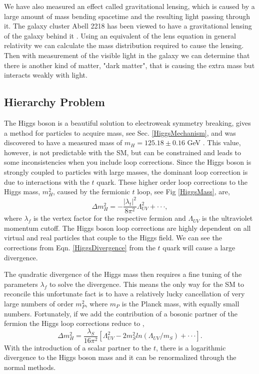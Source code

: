 We have also measured an effect called gravitational lensing, which is caused by a large amount of mass bending spacetime and the resulting light passing through it. The galaxy cluster Abell 2218 has been viewed to have a gravitational lensing of the galaxy behind it \cite{saraniti_gravitational_1996}. Using an equivalent of the lens equation in general relativity we can calculate the mass distribution required to cause the lensing. Then with measurement of the visible light in the galaxy we can determine that there is another kind of matter, "dark matter", that is causing the extra mass but interacts weakly with light. 

\subsection{Hierarchy Problem} 
The Higgs boson is a beautiful solution to electroweak symmetry breaking, gives a method for particles to acquire mass, see Sec. \ref{HiggsMechanism},  and was discovered to have a measured mass of $m_{H}=125.18\pm0.16$ GeV \cite{chatrchyan_observation_2012, aad_observation_2012, chatrchyan_observation_2013, atlas_collaboration_combined_2015}. This value, however, is not predictable with the SM, but can be constrained and leads to some inconsistencies when you include loop corrections. Since the Higgs boson is strongly coupled to particles with large masses, the dominant loop correction is due to interactions with the $t$ quark. These higher order loop corrections to the Higgs mass, $m_H^2$, caused by the fermionic $t$ loop, see Fig \ref{HiggsMass}, are,
\begin{equation} \label{HiggsDivergence}
\Delta m_{H}^{2}=-\frac{|\lambda_{t}|^{2}}{8\pi^{2}}\Lambda_{UV}^{2}+\cdot\cdot\cdot,
\end{equation}
where $\lambda_f$ is the vertex factor for the respective fermion and $\Lambda_{UV}$ is the ultraviolet momentum cutoff. The Higgs boson loop corrections are highly dependent on all virtual and real particles that couple to the Higgs field. We can see the corrections from Eqn. \ref{HiggsDivergence} from the $t$ quark will cause a large divergence. 

The quadratic divergence of the Higgs mass then requires a fine tuning of the parameters $\lambda_f$ to solve the divergence. This means the only way for the SM to reconcile this unfortunate fact is to have a relatively lucky cancellation of very large numbers of order $m_P^2$, where $m_P$ is the Planck mass, with equally small numbers. Fortunately, if we add the contribution of a bosonic partner of the fermion the Higgs loop corrections reduce to \cite{martin_supersymmetry_1997},
\begin{equation}
\Delta m_{H}^{2}=\frac{\lambda_{S}}{16\pi^{2}}[\Lambda_{UV}^{2} - 2m_{S}^{2}ln(\Lambda_{UV}/m_{S})+\cdot\cdot\cdot].
\label{HiggsRenormalization}
\end{equation}
With the introduction of a scalar partner to the $t$, there is a logarithmic divergence to the Higgs boson mass and it can be renormalized through the normal methods.

